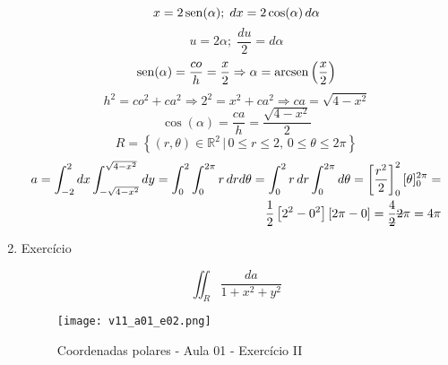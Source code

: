 \begin{enumerate}
\begin{align*}
	\end{align*}
	\begin{equation*}
		x = 2\operatorname{sen}(\alpha);\; dx = 2\cos(\alpha)\,d\alpha
	\end{equation*}
	\begin{equation*}
		u = 2\alpha;\; \dfrac{du}{2} = d\alpha
	\end{equation*}
	\begin{equation*}
		\operatorname{sen}(\alpha) = \dfrac{co}{h} = \dfrac{x}{2} \Rightarrow \alpha = \operatorname{arcsen}\left(\dfrac{x}{2}\right)
	\end{equation*}
	\begin{equation*}
		h^2 = co^2 + ca^2 \Rightarrow 2^2 = x^2 + ca^2 \Rightarrow ca = \sqrt{4 - x^2}
	\end{equation*}
	\begin{equation*}
		\cos(\alpha) = \dfrac{ca}{h} = \dfrac{\sqrt{4 - x^2}}{2}
	\end{equation*}
	\begin{equation*}
		R = \left\{(r, \theta) \in \mathbb{R}^2 \,|\, 0 \leq r \leq 2,\, 0 \leq \theta \leq 2\pi \right\}
	\end{equation*}
	\begin{align*}
		a = \int_{-2}^2 dx \int_{-\sqrt{4 - x^2}}^{\sqrt{4 - x^2}} dy = \int_0^2 \int_0^{2\pi} r\, drd\theta = \int_0^2 r\, dr \int_0^{2\pi} d\theta = \left[\dfrac{r^2}{2}\right]_0^2 [\theta]_0^{2\pi} =\\ \dfrac{1}{2}\left[2^2 - 0^2\right][2\pi - 0] = \dfrac{4}{\overstrike{2}}\overstrike{2}\pi = 4\pi
	\end{align*}
		
	\item Exercício
	
	\begin{equation*}
		\iint_R \dfrac{da}{1 + x^2 + y^2}
	\end{equation*}
	
	\begin{figure}[htb]
		\caption{Coordenadas polares - Aula 01 - Exercício II}
		\label{v11_a01_e02}
		\centering
		\texttt{[image: v11\_a01\_e02.png]}		
	\end{figure}
	

\end{enumerate}
